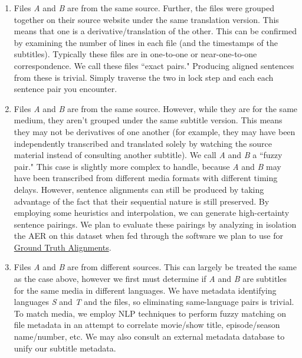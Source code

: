 \documentclass[twoside,twocolumn]{article}
\begin{document}
\begin{enumerate}

    \item Files \textit{A} and \textit{B} are from the same source. Further,
        the files were grouped together on their source website under the same
        translation version. This means that one is a derivative/translation
        of the other. This can be confirmed by examining the number of lines
        in each file (and the timestamps of the subtitles). Typically these
        files are in one-to-one or near-one-to-one correspondence. We call
        these files ``exact pairs." Producing aligned sentences from these is
        trivial. Simply traverse the two in lock step and each each sentence
        pair you encounter.

    \item Files \textit{A} and \textit{B} are from the same source. However,
        while they are for the same medium, they aren't grouped under the
        same subtitle version. This means they may not be derivatives of
        one another (for example, they may have been independently transcribed
        and translated solely by watching the source material instead of
        consulting another subtitle). We call \textit{A} and \textit{B} a 
        ``fuzzy pair." This case is slightly more complex to handle, because
        \textit{A} and \textit{B} may have been transcribed from different
        media formats with different timing delays. However, sentence
        alignments can still be produced by taking advantage of the fact that
        their sequential nature is still preserved. By employing some
        heuristics and interpolation, we can generate high-certainty sentence
        pairings. We plan to evaluate these pairings by analyzing in isolation
        the AER on this dataset when fed through the software we plan to use
        for \hyperref[subsec:ground-truth-alignments]{Ground Truth Alignments}.

    \item Files \textit{A} and \textit{B} are from different sources. This can
        largely be treated the same as the case above, however we first must
        determine if \textit{A} and \textit{B} are subtitles for the same media
        in different languages. We have metadata identifying languages
        \textit{S} and \textit{T} and the files, so eliminating same-language
        pairs is trivial. To match media, we employ NLP techniques to perform
        fuzzy matching on file metadata in an attempt to correlate movie/show
        title, episode/season name/number, etc. We may also consult an external
        metadata database to unify our subtitle metadata.

\end{enumerate}
\end{document}

